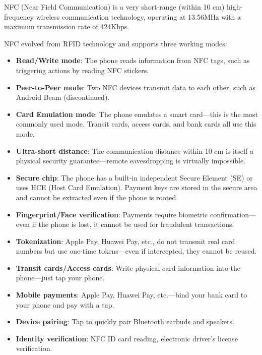 
NFC (Near Field Communication) is a very short-range (within 10 cm) high-frequency wireless communication technology, operating at 13.56MHz with a maximum transmission rate of 424Kbps.


NFC evolved from RFID technology and supports three working modes:

\begin{itemize}
  \item \textbf{Read/Write mode}: The phone reads information from NFC tags, such as triggering actions by reading NFC stickers.
  \item \textbf{Peer-to-Peer mode}: Two NFC devices transmit data to each other, such as Android Beam (discontinued).
  \item \textbf{Card Emulation mode}: The phone emulates a smart card—this is the most commonly used mode. Transit cards, access cards, and bank cards all use this mode.
\end{itemize}


\begin{itemize}
  \item \textbf{Ultra-short distance}: The communication distance within 10 cm is itself a physical security guarantee—remote eavesdropping is virtually impossible.
  \item \textbf{Secure chip}: The phone has a built-in independent Secure Element (SE) or uses HCE (Host Card Emulation). Payment keys are stored in the secure area and cannot be extracted even if the phone is rooted.
  \item \textbf{Fingerprint/Face verification}: Payments require biometric confirmation—even if the phone is lost, it cannot be used for fraudulent transactions.
  \item \textbf{Tokenization}: Apple Pay, Huawei Pay, etc., do not transmit real card numbers but use one-time tokens—even if intercepted, they cannot be reused.
\end{itemize}


\begin{itemize}
  \item \textbf{Transit cards/Access cards}: Write physical card information into the phone—just tap your phone.
  \item \textbf{Mobile payments}: Apple Pay, Huawei Pay, etc.—bind your bank card to your phone and pay with a tap.
  \item \textbf{Device pairing}: Tap to quickly pair Bluetooth earbuds and speakers.
  \item \textbf{Identity verification}: NFC ID card reading, electronic driver's license verification.
\end{itemize}

